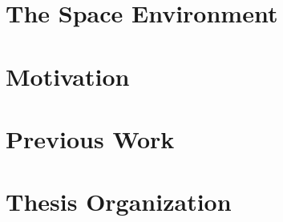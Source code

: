 \section{The Space Environment}
\section{Motivation}
\section{Previous Work}
\section{Thesis Organization}
